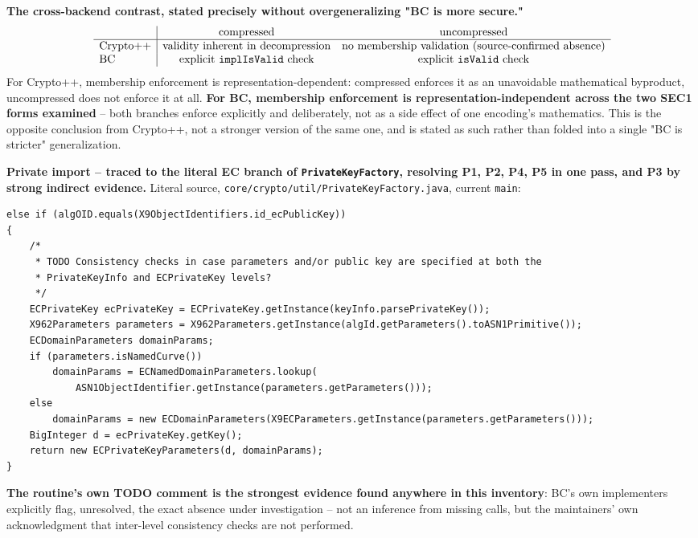\documentclass[11pt,a4paper]{article}
\begin{document}
\textbf{The cross-backend contrast, stated precisely without overgeneralizing "BC is more secure."}
\[
\begin{array}{l|cc}
 & \text{compressed} & \text{uncompressed} \\
\hline
\text{Crypto++} & \text{validity inherent in decompression} & \text{no membership validation (source-confirmed absence)} \\
\text{BC} & \text{explicit \texttt{implIsValid} check} & \text{explicit \texttt{isValid} check}
\end{array}
\]
For Crypto++, membership enforcement is representation-dependent: compressed enforces it as an unavoidable mathematical byproduct, uncompressed does not enforce it at all. \textbf{For BC, membership enforcement is representation-independent across the two SEC1 forms examined} -- both branches enforce explicitly and deliberately, not as a side effect of one encoding's mathematics. This is the opposite conclusion from Crypto++, not a stronger version of the same one, and is stated as such rather than folded into a single "BC is stricter" generalization.

\textbf{Private import -- traced to the literal EC branch of \texttt{PrivateKeyFactory}, resolving P1, P2, P4, P5 in one pass, and P3 by strong indirect evidence.} Literal source, \texttt{core/crypto/util/PrivateKeyFactory.java}, current \texttt{main}:
\begin{verbatim}
else if (algOID.equals(X9ObjectIdentifiers.id_ecPublicKey))
{
    /*
     * TODO Consistency checks in case parameters and/or public key are specified at both the
     * PrivateKeyInfo and ECPrivateKey levels?
     */
    ECPrivateKey ecPrivateKey = ECPrivateKey.getInstance(keyInfo.parsePrivateKey());
    X962Parameters parameters = X962Parameters.getInstance(algId.getParameters().toASN1Primitive());
    ECDomainParameters domainParams;
    if (parameters.isNamedCurve())
        domainParams = ECNamedDomainParameters.lookup(
            ASN1ObjectIdentifier.getInstance(parameters.getParameters()));
    else
        domainParams = new ECDomainParameters(X9ECParameters.getInstance(parameters.getParameters()));
    BigInteger d = ecPrivateKey.getKey();
    return new ECPrivateKeyParameters(d, domainParams);
}
\end{verbatim}
\textbf{The routine's own TODO comment is the strongest evidence found anywhere in this inventory}: BC's own implementers explicitly flag, unresolved, the exact absence under investigation -- not an inference from missing calls, but the maintainers' own acknowledgment that inter-level consistency checks are not performed.
\end{document}
